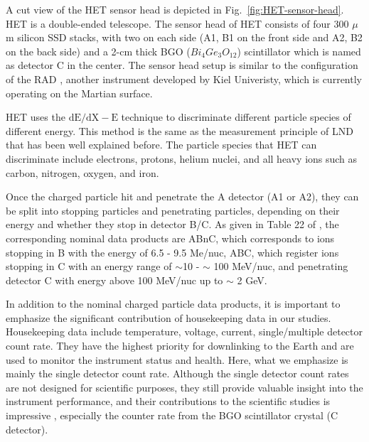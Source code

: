 A cut view of the \ac{HET} sensor head is depicted in Fig.~\ref{fig:HET-sensor-head}. \ac{HET} is a double-ended telescope. The sensor head of \ac{HET} consists of four 300 $\mu$m silicon \ac{SSD} stacks, with two on each side (A1, B1 on the front side and A2, B2 on the back side) and a 2-cm thick \ac{BGO} ($Bi_{4}Ge_{3}O_{12}$) scintillator which is named as detector C in the center. The sensor head setup is similar to the configuration of the \ac{RAD} \citep{Hassler-2012-MSLRAD}, another instrument developed by Kiel Univeristy, which is currently operating on the Martian surface.  

\ac{HET} uses the $\mathrm{dE/dX - E}$ technique to discriminate different particle species of different energy. This method is the same as the measurement principle of \ac{LND} that has been well explained before. The particle species that \ac{HET} can discriminate include electrons, protons, helium nuclei, and all heavy ions such as carbon, nitrogen, oxygen, and iron.  

Once the charged particle hit and penetrate the A detector (A1 or A2), they can be split into stopping particles and penetrating particles, depending on their energy and whether they stop in detector B/C. As given in Table 22 of \citet{RodriguezPacheco-2019-EPD}, the corresponding nominal data products are ABnC, which corresponds to ions stopping in B with the energy of 6.5 - 9.5 Me/nuc, ABC, which register ions stopping in C with an energy range of $\sim$10 - $\sim$ 100 MeV/nuc, and penetrating detector C with energy above 100 MeV/nuc up to $\sim$ 2 GeV.



In addition to the nominal charged particle data products, it is important to emphasize the significant contribution of housekeeping data in our studies. Housekeeping data include temperature, voltage, current, single/multiple detector count rate.  
They have the highest priority for downlinking to the Earth and are used to monitor the instrument status and health. Here, what we emphasize is mainly the single detector count rate. Although the single detector count rates are not designed for scientific purposes, they still provide valuable insight into the instrument performance, and their contributions to the scientific studies is impressive \citep{Wimmer2021AA}, especially the counter rate from the \ac{BGO} scintillator crystal (C detector). 

